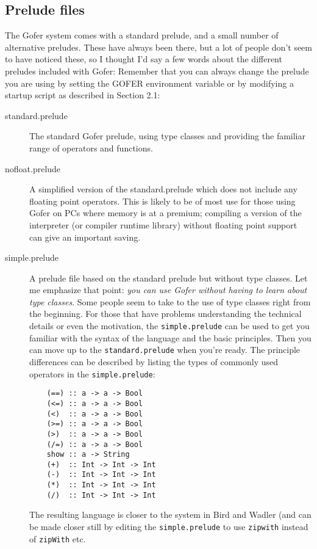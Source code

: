 \subsection{Prelude files}
The Gofer system comes with a standard prelude, and a small number of
alternative preludes.  These have always been there, but a lot of
people don't seem to have noticed these, so I thought I'd say a few
words about the different preludes included with Gofer: Remember that
you can always change the prelude you are using by setting the GOFER
environment variable or by modifying a startup script as described in
Section 2.1:
\begin{description}
\item[standard.prelude]    The standard Gofer prelude, using type classes
                        and providing the familiar range of operators
                        and functions.

\item[nofloat.prelude]     A simplified version of the standard.prelude
                        which does not include any floating point
                        operators.  This is likely to be of most use
                        for those using Gofer on PCs where memory is
                        at a premium; compiling a version of the
                        interpreter (or compiler runtime library)
                        without floating point support can give an
                        important saving.

\item[simple.prelude]      A prelude file based on the standard prelude
                        but without type classes.  Let me emphasize
                        that point: {\em you can use Gofer without having
                        to learn about type classes}.  Some people
                        seem to take to the use of type classes right
                        from the beginning.  For those that have
                        problems understanding the technical details
                        or even the motivation, the \verb"simple.prelude"
                        can be used to get you familiar with the syntax
                        of the language and the basic principles.
                        Then you can move up to the \verb"standard.prelude"
                        when you're ready.  The principle differences
                        can be described by listing the types of
                        commonly used operators in the \verb"simple.prelude":
\begin{verbatim}
    (==) :: a -> a -> Bool
    (<=) :: a -> a -> Bool
    (<)  :: a -> a -> Bool
    (>=) :: a -> a -> Bool
    (>)  :: a -> a -> Bool
    (/=) :: a -> a -> Bool
    show :: a -> String
    (+)  :: Int -> Int -> Int
    (-)  :: Int -> Int -> Int
    (*)  :: Int -> Int -> Int
    (/)  :: Int -> Int -> Int
\end{verbatim}
                        The resulting language is closer to the system
                        in Bird and Wadler (and can be made closer
                        still by editing the \verb"simple.prelude" to use
                        \verb"zipwith" instead of \verb"zipWith" etc.


\end{description}
